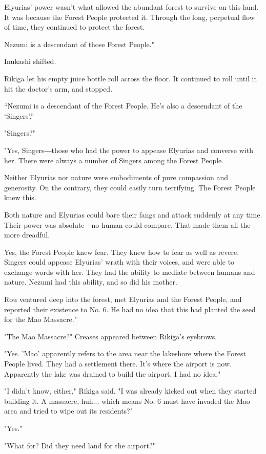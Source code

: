 Elyurias' power wasn't what allowed the abundant forest to survive on
this land. It was because the Forest People protected it. Through the
long, perpetual flow of time, they continued to protect the forest.

Nezumi is a descendant of those Forest People."

Inukashi shifted.

Rikiga let his empty juice bottle roll across the floor. It continued to
roll until it hit the doctor's arm, and stopped.

\enquote{Nezumi is a descendant of the Forest People. He's also a descendant of
the \enquote{Singers}.}

"Singers?"

"Yes, Singers―those who had the power to appease Elyurias and converse
with her. There were always a number of Singers among the Forest
People.

Neither Elyurias nor nature were embodiments of pure compassion and
generosity. On the contrary, they could easily turn terrifying. The
Forest People knew this.

Both nature and Elyurias could bare their fangs and attack suddenly at
any time. Their power was absolute―no human could compare. That made
them all the more dreadful.

Yes, the Forest People knew fear. They knew how to fear as well as
revere. Singers could appease Elyurias' wrath with their voices, and
were able to exchange words with her. They had the ability to mediate
between humans and nature. Nezumi had this ability, and so did his
mother.

Rou ventured deep into the forest, met Elyurias and the Forest People,
and reported their existence to No. 6. He had no idea that this had
planted the seed for the Mao Massacre."

"The Mao Massacre?" Creases appeared between Rikiga's eyebrows.

"Yes. 'Mao' apparently refers to the area near the lakeshore where the
Forest People lived. They had a settlement there. It's where the airport
is now. Apparently the lake was drained to build the airport. I had no
idea."

"I didn't know, either," Rikiga said. "I was already kicked out when
they started building it. A massacre, huh... which means No. 6 must have
invaded the Mao area and tried to wipe out its residents?"

"Yes."

"What for? Did they need land for the airport?"

